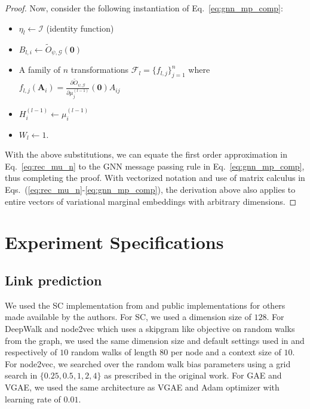 \documentclass{article}
\begin{document}
\begin{proof}
Now, consider the following instantiation of Eq.~\eqref{eq:gnn_mp_comp}:
\begin{itemize}
\item $\eta_{l}\leftarrow \mathcal{I}$ (identity function)
\item $B_{l,i} \leftarrow  \tilde{O}_{\psi, \mathcal{G}}\left(\mathbf{0}\right)$
\item A family of $n$ transformations $\mathcal{F}_l = \{f_{l,j}\}_{j=1}^n$ where $f_{l,j}(\mathbf{A}_i) = 
 \frac{\partial \tilde{O}_{\psi, \mathcal{G}}}{\partial \mu^{(l-1)}_j}\left(\mathbf{0}\right)
A_{ij}$
\item $H^{(l-1)}_i \leftarrow \mu^{(l-1)}_i$
\item $W_{l} \leftarrow 1$.
\end{itemize}

With the above substitutions, we can equate the first order approximation in Eq.~\eqref{eq:rec_mu_n} to the GNN message passing rule in Eq.~\eqref{eq:gnn_mp_comp}, thus completing the proof. With vectorized notation and use of matrix calculus in Eqs.~(\ref{eq:rec_mu_n}-\ref{eq:gnn_mp_comp}), the derivation above also applies to entire vectors of variational marginal embeddings with arbitrary dimensions.
\end{proof}















\section{Experiment Specifications}\label{app:expt}




\subsection{Link prediction}




We used the SC implementation from \citep{pedregosa2011scikit} and public implementations for others made available by the authors. For SC, we used a dimension size of $128$. For DeepWalk and node2vec which uses a skipgram like objective on random walks from the graph, we used the same dimension size and default settings used in \citep{perozzi2014deepwalk} and \citep{grover2016node2vec} respectively of $10$ random walks of length $80$ per node and a context size of $10$. For node2vec, we searched over the random walk bias parameters using a grid search in $\{0.25, 0.5, 1, 2, 4\}$ as prescribed in the original work. For GAE and VGAE, we used the same architecture as VGAE and Adam optimizer with learning rate of $0.01$. 
\end{document}
